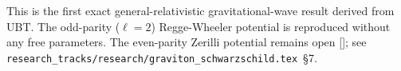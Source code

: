 \begin{remark}
This is the first exact general-relativistic gravitational-wave result
derived from UBT.  The odd-parity ($\ell=2$) Regge-Wheeler potential
is reproduced without any free parameters.  The even-parity Zerilli
potential remains open [\Ltwo]; see \texttt{research\_tracks/research/graviton\_schwarzschild.tex}~§7.
\end{remark}

